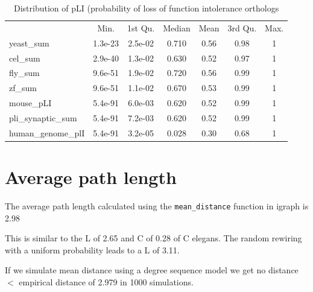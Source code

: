 \begin{table}[ht]
    \centering
    \begin{tabular}{lcccccc}
    &                 Min.& 1st Qu. &Median& Mean& 3rd Qu.& Max.\\
yeast\_sum   &     1.3e-23& 2.5e-02&  0.710& 0.56&    0.98 &   1\\
cel\_sum     &     2.9e-40& 1.3e-02&  0.630& 0.52&    0.97 &  1\\
fly\_sum      &    9.6e-51 &1.9e-02&  0.720& 0.56&    0.99 &  1\\
zf\_sum        &   9.6e-51& 1.1e-02&  0.670& 0.53&    0.99  &  1\\
mouse\_pLI      &  5.4e-91 &6.0e-03&  0.620& 0.52&    0.99   &1\\
pli\_synaptic\_sum & 5.4e-91 &7.2e-03&  0.620& 0.52&    0.99  &  1\\
human\_genome\_plI &5.4e-91 &3.2e-05&  0.028& 0.30&    0.68  &  1\\
  
    \end{tabular}
    \caption{Distribution of pLI (probability of loss of function intolerance orthologs}
    \label{tab:pLI orthologs}
\end{table}


\section{Average path length}
The average path length calculated using the \texttt{mean\_distance} function in igraph is 2.98


This is similar to the L of 2.65 and C of 0.28 of C elegans. The random rewiring with a uniform probability leads to a L of 3.11. 

If we simulate mean distance using a degree sequence model we get no distance $<$ empirical distance of 2.979 in 1000 simulations.
    
